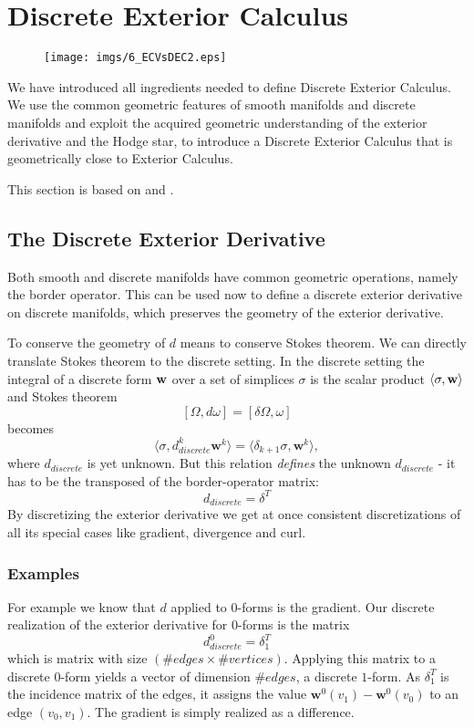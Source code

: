 


\newpage
\section{Discrete Exterior Calculus}
\begin{figure}[h]%
\begin{center}
\texttt{[image: imgs/6\_ECVsDEC2.eps]}%
\end{center}
\end{figure}
\noindent  We have introduced all ingredients needed  to define Discrete Exterior Calculus. We use the common geometric features of smooth manifolds and discrete manifolds  and exploit the acquired  geometric understanding of the exterior derivative and the Hodge star, to introduce a Discrete Exterior Calculus that is geometrically close to Exterior Calculus.

This section is based on \cite{hirani03} and \cite{DMK08}.


\subsection{The Discrete Exterior Derivative}
Both smooth and discrete manifolds have common geometric operations, namely the border operator. This can be used now to define a discrete exterior derivative on discrete manifolds, which preserves the geometry of the exterior derivative. 

To conserve the geometry of $d$ means to conserve Stokes theorem.  We can directly translate Stokes theorem to the discrete setting. In the discrete setting the integral of a discrete form $\textbf{w}$ over a set of simplices $\sigma$ is the scalar product $\langle \sigma, \textbf{w} \rangle$ and Stokes theorem
\[[\Omega,d\omega] = [\delta \Omega, \omega]\]
becomes
\[\langle \sigma, d_{discrete}^k\textbf{w}^k \rangle = \langle \delta_{k+1} \sigma, \textbf{w}^k \rangle,\]
where $d_{discrete}$ is yet unknown. But this relation \emph{defines} the unknown $d_{discrete}$ - it has to be the transposed of the border-operator matrix:
\[d_{discrete} = \delta^T\]
By discretizing the exterior derivative we get at once consistent discretizations of all its special cases like gradient, divergence and curl. 

\subsubsection{Examples}
For example we know that $d$ applied to $0$-forms is the gradient. Our discrete realization of the exterior derivative for $0$-forms is the matrix
\[d_{discrete}^0 = \delta_1^T\]
which is matrix with size $(\# edges \times \#vertices)$. Applying this matrix to a discrete $0$-form yields a vector of dimension $\# edges$, a discrete $1$-form. As $\delta_1^T$ is the incidence matrix of the edges, it assigns the value $\textbf{w}^0(v_1) - \textbf{w}^0(v_0)$ to an edge $(v_0,v_1)$. The gradient is simply realized as a difference.

